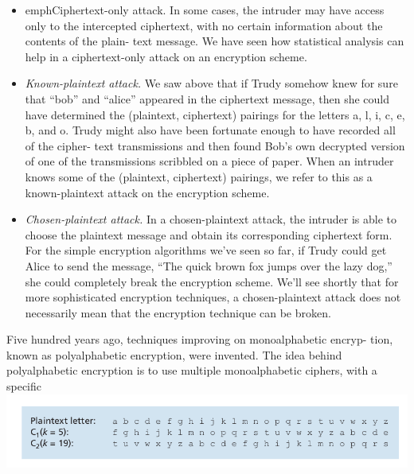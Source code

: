 \documentclass{report}
\theoremstyle{definition}
\begin{document}
{{{\begin{itemize}
\item{emph{Ciphertext-only attack.} In some cases, the intruder may have access only to the
intercepted ciphertext, with no certain information about the contents of the plain-
text message. We have seen how statistical analysis can help in a ciphertext-only
attack on an encryption scheme.}
\item{\emph{Known-plaintext attack.} We saw above that if Trudy somehow knew for sure
that “bob” and “alice” appeared in the ciphertext message, then she could have
determined the (plaintext, ciphertext) pairings for the letters a, l, i, c, e, b, and o.
Trudy might also have been fortunate enough to have recorded all of the cipher-
text transmissions and then found Bob’s own decrypted version of one of the
transmissions scribbled on a piece of paper. When an intruder knows some of the
(plaintext, ciphertext) pairings, we refer to this as a known-plaintext attack on
the encryption scheme.}
\item{\emph{Chosen-plaintext attack.} In a chosen-plaintext attack, the intruder is able to
choose the plaintext message and obtain its corresponding ciphertext form. For
the simple encryption algorithms we’ve seen so far, if Trudy could get Alice to
send the message, “The quick brown fox jumps over the lazy
dog,” she could completely break the encryption scheme. We’ll see shortly that
for more sophisticated encryption techniques, a chosen-plaintext attack does not
necessarily mean that the encryption technique can be broken.}
\end{itemize}
Five hundred years ago, techniques improving on monoalphabetic encryp-
tion, known as polyalphabetic encryption, were invented. The idea behind
polyalphabetic encryption is to use multiple monoalphabetic ciphers, with a specific
\newline
\includegraphics[scale=0.5]{polycs}\newline

}}}
\end{document}
